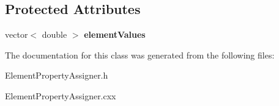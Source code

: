 \subsection*{Protected Attributes}
\begin{DoxyCompactItemize}
\item 
\hypertarget{class_element_property_assigner_a2aaf260beb6c29af1b1c80fa7adf9fc8}{
vector$<$ double $>$ {\bfseries elementValues}}
\label{class_element_property_assigner_a2aaf260beb6c29af1b1c80fa7adf9fc8}

\end{DoxyCompactItemize}


The documentation for this class was generated from the following files:\begin{DoxyCompactItemize}
\item 
ElementPropertyAssigner.h\item 
ElementPropertyAssigner.cxx\end{DoxyCompactItemize}
